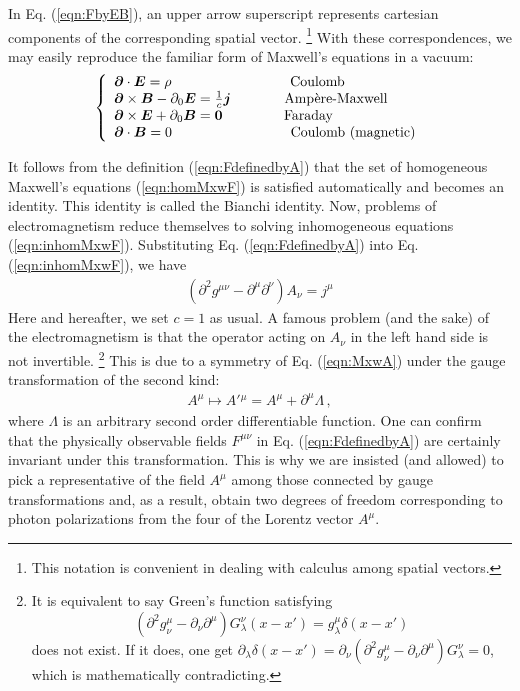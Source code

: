 In Eq. (\ref{eqn:FbyEB}), an upper arrow
superscript represents cartesian components of the corresponding spatial vector.
\footnote{%
This notation is convenient in dealing with
calculus among spatial vectors.
}
With these correspondences, we may easily reproduce
the familiar form of Maxwell's equations in a vacuum:
\[
\left\{
\begin{array}{l}
\bld{\partial}\cdot \bld{E} =  \rho 
\hspace{30mm}\mbox{Coulomb}
\\
\bld{\partial} \times \bld{B}  - \partial_0 \bld{E} = \frac{1}{c}\bld{j}
\hspace{13.5mm}\mbox{Amp\`ere-Maxwell}
\\
\bld{\partial} \times \bld{E}  +  \partial_0 \bld{B} = \bld{0}
\hspace{15.5mm}\mbox{Faraday}
\\
\bld{\partial}\cdot \bld{B} = 0
\hspace{30mm}\mbox{Coulomb (magnetic)}
\\
\end{array}
\right.
\]

It follows from the definition (\ref{eqn:FdefinedbyA}) that
the set of
homogeneous Maxwell's equations (\ref{eqn:homMxwF})
is satisfied automatically and becomes an identity.
This identity  is called the Bianchi identity.
Now, problems of electromagnetism reduce themselves to solving inhomogeneous
equations (\ref{eqn:inhomMxwF}). Substituting Eq. (\ref{eqn:FdefinedbyA}) into
Eq. (\ref{eqn:inhomMxwF}), we have
\begin{eqnarray}
(\partial^2 g^{\mu \nu} - \partial^\mu \partial^\nu) A_\nu = j^\mu
\label{eqn:MxwA}
\end{eqnarray}
Here and hereafter, we set $c = 1$ as usual.
A famous problem (and the sake) of the electromagnetism is that
the operator acting on $A_\nu$ in the left hand side
is not invertible.
\footnote{%
It is equivalent to say Green's function satisfying 
\[(\partial^2 g^\mu_\nu
 - \partial_\nu \partial^\mu) G^\nu_\lambda (x-x')=
 g^\mu_\lambda \delta(x -x')
\]
does not exist. If it does, one get
$\partial_\lambda \delta(x - x') = \partial_\nu 
(\partial^2 g^\mu_\nu - \partial_\nu \partial^\mu) G^\nu_\lambda
= 0$,
which is mathematically contradicting.}%
This is due to a symmetry of Eq. (\ref{eqn:MxwA}) under the gauge transformation
of the second kind:
\begin{eqnarray}
A^\mu \mapsto A'{}^{\mu} = A^\mu + \partial^\mu \Lambda\,,
\label{eqn:SecondOrderGaugeTransf}
\end{eqnarray}
where $\Lambda$ is an arbitrary second order differentiable function.
One can confirm that the physically observable fields $F^{\mu \nu}$ in Eq. (\ref{eqn:FdefinedbyA}) 
are certainly invariant under this transformation. 
This is why we are insisted (and allowed) to pick a representative of the field $A^\mu$
among those connected by gauge transformations
and, as a result, obtain two degrees of freedom corresponding to photon polarizations
from the  four of the Lorentz vector $A^\mu$.

